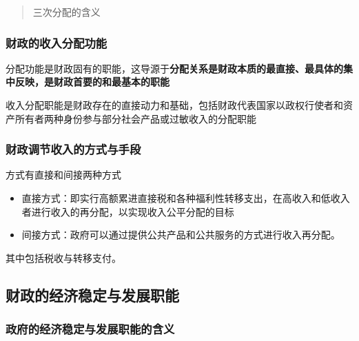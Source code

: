 \documentclass[
]{book}
\providecommand{\tightlist}{%
  \setlength{\itemsep}{0pt}\setlength{\parskip}{0pt}}
\begin{document}
\begin{quote}
三次分配的含义
\end{quote}

\hypertarget{ux8d22ux653fux7684ux6536ux5165ux5206ux914dux529fux80fd}{%
\subsubsection{财政的收入分配功能}\label{ux8d22ux653fux7684ux6536ux5165ux5206ux914dux529fux80fd}}

分配功能是财政固有的职能，这导源于\textbf{分配关系是财政本质的最直接、最具体的集中反映，是财政首要的和最基本的职能}

收入分配职能是财政存在的直接动力和基础，包括财政代表国家以政权行使者和资产所有者两种身份参与部分社会产品或过敏收入的分配职能

\hypertarget{ux8d22ux653fux8c03ux8282ux6536ux5165ux7684ux65b9ux5f0fux4e0eux624bux6bb5}{%
\subsubsection{财政调节收入的方式与手段}\label{ux8d22ux653fux8c03ux8282ux6536ux5165ux7684ux65b9ux5f0fux4e0eux624bux6bb5}}

方式有直接和间接两种方式

\begin{itemize}
\tightlist
\item
  直接方式：即实行高额累进直接税和各种福利性转移支出，在高收入和低收入者进行收入的再分配，以实现收入公平分配的目标
\item
  间接方式：政府可以通过提供公共产品和公共服务的方式进行收入再分配。
\end{itemize}

其中包括税收与转移支付。

\hypertarget{ux8d22ux653fux7684ux7ecfux6d4eux7a33ux5b9aux4e0eux53d1ux5c55ux804cux80fd}{%
\subsection{财政的经济稳定与发展职能}\label{ux8d22ux653fux7684ux7ecfux6d4eux7a33ux5b9aux4e0eux53d1ux5c55ux804cux80fd}}

\hypertarget{ux653fux5e9cux7684ux7ecfux6d4eux7a33ux5b9aux4e0eux53d1ux5c55ux804cux80fdux7684ux542bux4e49}{%
\subsubsection{政府的经济稳定与发展职能的含义}\label{ux653fux5e9cux7684ux7ecfux6d4eux7a33ux5b9aux4e0eux53d1ux5c55ux804cux80fdux7684ux542bux4e49}}
\end{document}
